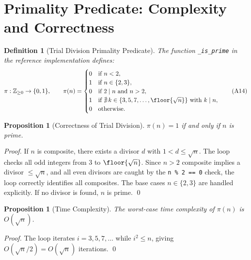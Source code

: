 \documentclass[11pt,letterpaper]{article}
\newtheorem{proposition}[theorem]{Proposition}
\newtheorem{definition}[theorem]{Definition}
\theoremstyle{remark}
\begin{document}
\section{Primality Predicate: Complexity and Correctness}
\label{sec:primality}

\begin{definition}[Trial Division Primality Predicate]
The function \texttt{\_is\_prime} in the reference implementation defines:
\[
  \pi: \mathbb{Z}_{\geq 0} \to \{0, 1\}, \qquad
  \pi(n) = \begin{cases}
    0 & \text{if } n < 2, \\
    1 & \text{if } n \in \{2, 3\}, \\
    0 & \text{if } 2 \mid n \text{ and } n > 2, \\
    1 & \text{if } \nexists\, k \in \{3,5,7,\ldots,\floor{\sqrt{n}}\}
         \text{ with } k \mid n, \\
    0 & \text{otherwise.}
  \end{cases} \tag{A14}
\]
\end{definition}

\begin{proposition}[Correctness of Trial Division]
\label{prop:prime-correct}
$\pi(n) = 1$ if and only if $n$ is prime.
\end{proposition}

\begin{proof}
If $n$ is composite, there exists a divisor $d$ with $1 < d \leq \sqrt{n}$.
The loop checks all odd integers from $3$ to $\floor{\sqrt{n}}$.
Since $n > 2$ composite implies a divisor $\leq \sqrt{n}$, and all even
divisors are caught by the \texttt{n \% 2 == 0} check, the loop correctly
identifies all composites.  The base cases $n \in \{2, 3\}$ are handled
explicitly.  If no divisor is found, $n$ is prime. \qed
\end{proof}

\begin{proposition}[Time Complexity]
\label{prop:prime-complexity}
The worst-case time complexity of $\pi(n)$ is
$O(\sqrt{n})$.
\end{proposition}

\begin{proof}
The loop iterates $i = 3, 5, 7, \ldots$ while $i^2 \leq n$, giving
$O(\sqrt{n}/2) = O(\sqrt{n})$ iterations. \qed
\end{proof}
\end{document}
